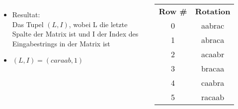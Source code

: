 \documentclass[14pt,xcolor=dvipsnames,pdftex]{beamer}
\begin{document}
\begin{frame}[allowframebreaks]
\begin{columns}[c,onlytextwidth]
 \begin{itemize}
  \item Resultat:\\
      Das Tupel \textit{$(L,I)$}, wobei L die {\color{red}letzte Spalte} der Matrix ist
      und I der Index des {\color{darkgreen}Eingabestrings in der Matrix} ist
  \item $(L,I) = (caraab, 1)$
 \end{itemize}
    \begin{tabular}{c|c}
    \textbf{Row \#} & \textbf{Rotation} \\
    0 & aabra{\color{red}c} \\
    {\color{darkgreen}1} & {\color{darkgreen}abrac}{\color{red}a} \\
    2 & acaab{\color{red}r} \\
    3 & braca{\color{red}a} \\
    4 & caabr{\color{red}a} \\
    5 & racaa{\color{red}b} \\
    \end{tabular}
\end{columns}
\end{frame}
\end{document}
